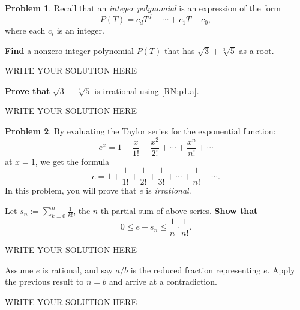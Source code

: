 \documentclass[11pt]{article}
\theoremstyle{plain}
\theoremstyle{definition}
\newtheorem{problem}{Problem}
\theoremstyle{remark}
\numberwithin{equation}{problem}
\begin{document}
\begin{problem}
	Recall that an \emph{integer polynomial} is an expression of the form 
	\[P(T)=c_dT^d+\cdots+c_1T+c_0,\] 
	where each $c_i$ is an integer. 
	\begin{listinprob}
		\item\label{RN:p1.a} \textbf{Find} a nonzero integer polynomial $P(T)$ that has $\sqrt{3}+\sqrt[3]{5}$ as a root.
	\end{listinprob}
\begin{solution} %
WRITE YOUR SOLUTION HERE
\end{solution}\clearpage %
	\begin{listinprob}[resume]
		\item \textbf{Prove that} $\sqrt{3}+\sqrt[3]{5}$ is irrational using \ref{RN:p1.a}.
	\end{listinprob}
\begin{solution} %
WRITE YOUR SOLUTION HERE
\end{solution}\clearpage %
\end{problem}


\begin{problem}
	By evaluating the Taylor series for the exponential function:
	\[
		e^{x} = 1 + \frac{x}{1!} + \frac{x^2}{2!} + \cdots + \frac{x^n}{n!} + \cdots
	\]
	at $x=1$, we get the formula
	\[
		e = 1 + \frac{1}{1!} + \frac{1}{2!} + \frac{1}{3!} + \cdots + \frac{1}{n!} + \cdots.
	\]
	In this problem, you will prove that $e$ is \emph{irrational}.
	\begin{listinprob}
		\item Let $s_n := \sum\limits_{k=0}^n \frac{1}{k!}$, the $n$-th partial sum of above series. \textbf{Show that} 
		\[
			0 \leq e - s_n \leq \frac{1}{n}\cdot \frac{1}{n!}.
		\]
	\end{listinprob}
\begin{solution} %
WRITE YOUR SOLUTION HERE
\end{solution}\clearpage %
	\begin{listinprob}[resume]
		\item Assume $e$ is rational, and say $a/b$ is the reduced fraction representing $e$. Apply the previous result to $n = b$ and arrive at a contradiction.
	\end{listinprob}
\begin{solution} %
WRITE YOUR SOLUTION HERE
\end{solution}\clearpage %
\end{problem}
\end{document}
